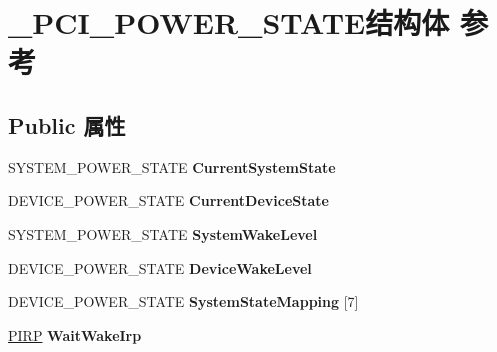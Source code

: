 \hypertarget{struct___p_c_i___p_o_w_e_r___s_t_a_t_e}{}\section{\+\_\+\+P\+C\+I\+\_\+\+P\+O\+W\+E\+R\+\_\+\+S\+T\+A\+T\+E结构体 参考}
\label{struct___p_c_i___p_o_w_e_r___s_t_a_t_e}
\subsection*{Public 属性}
\begin{DoxyCompactItemize}
\item 
\mbox{\label{struct___p_c_i___p_o_w_e_r___s_t_a_t_e_a8c2e3b123d999749b5e34cf81c742ab8}} 
S\+Y\+S\+T\+E\+M\+\_\+\+P\+O\+W\+E\+R\+\_\+\+S\+T\+A\+TE {\bfseries Current\+System\+State}
\item 
\mbox{\label{struct___p_c_i___p_o_w_e_r___s_t_a_t_e_a576bbc2b7058da3cc272690e8a893cc3}} 
D\+E\+V\+I\+C\+E\+\_\+\+P\+O\+W\+E\+R\+\_\+\+S\+T\+A\+TE {\bfseries Current\+Device\+State}
\item 
\mbox{\label{struct___p_c_i___p_o_w_e_r___s_t_a_t_e_a8cd4b5e34c7b948efde0cd03df77db9d}} 
S\+Y\+S\+T\+E\+M\+\_\+\+P\+O\+W\+E\+R\+\_\+\+S\+T\+A\+TE {\bfseries System\+Wake\+Level}
\item 
\mbox{\label{struct___p_c_i___p_o_w_e_r___s_t_a_t_e_a4054b34f048260772c427359dc3e36de}} 
D\+E\+V\+I\+C\+E\+\_\+\+P\+O\+W\+E\+R\+\_\+\+S\+T\+A\+TE {\bfseries Device\+Wake\+Level}
\item 
\mbox{\label{struct___p_c_i___p_o_w_e_r___s_t_a_t_e_a84eaa2cc5639b95217345188dbb0d97a}} 
D\+E\+V\+I\+C\+E\+\_\+\+P\+O\+W\+E\+R\+\_\+\+S\+T\+A\+TE {\bfseries System\+State\+Mapping} \mbox{[}7\mbox{]}
\item 
\mbox{\label{struct___p_c_i___p_o_w_e_r___s_t_a_t_e_adce75a6c34f6a3db8badb8307274d8bc}} 
\hyperlink{interfacevoid}{P\+I\+RP} {\bfseries Wait\+Wake\+Irp}
\item 

\end{DoxyCompactItemize}

